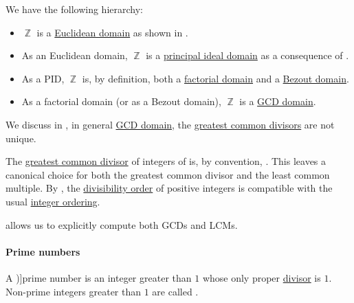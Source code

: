 \begin{remark}\label{rem:integer_domain_chain}\hfill
  We have the following hierarchy:
  \begin{itemize}
    \item \( \BbbZ \) is a \hyperref[def:euclidean_domain]{Euclidean domain} as shown in .
    \item As an Euclidean domain, \( \BbbZ \) is a \hyperref[def:principal_ideal_domain]{principal ideal domain} as a consequence of .
    \item As a PID, \( \BbbZ \) is, by definition, both a \hyperref[def:factorial_domain]{factorial domain} and a \hyperref[def:bezout_domain]{Bezout domain}.
    \item As a factorial domain (or as a Bezout domain), \( \BbbZ \) is a \hyperref[def:gcd_domain]{GCD domain}.
  \end{itemize}
\end{remark}

\begin{remark}\label{rem:integer_gcd}
  We discuss in , in general \hyperref[def:gcd_domain]{GCD domain}, the \hyperref[def:gcd]{greatest common divisors} are not unique.

  The \hyperref[def:gcd]{greatest common divisor} of integers of is, by convention, . This leaves a canonical choice for both the greatest common divisor and the least common multiple. By , the \hyperref[thm:semiring_divisibility_order]{divisibility order} of positive integers is compatible with the usual \hyperref[def:integer_ordering]{integer ordering}.

   allows us to explicitly compute both GCDs and LCMs.
\end{remark}

\paragraph{Prime numbers}

\begin{definition}\label{def:prime_number}
  A \term[ru=простое число (\cite[45]{Зорич2019АнализТом1})]{prime number} is an integer greater than \( 1 \) whose only proper \hyperref[def:divisibility]{divisor} is \( 1 \). Non-prime integers greater than \( 1 \) are called .
\end{definition}

